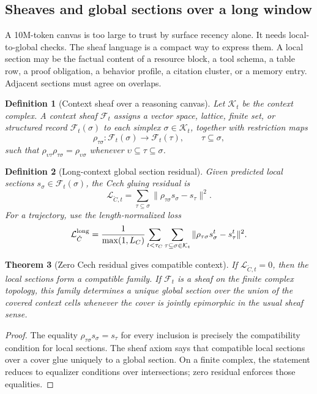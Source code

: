 \documentclass[11pt]{article}
\newtheorem{theorem}{Theorem}[section]
\newtheorem{definition}[theorem]{Definition}
\newcommand{\calK}{\mathcal{K}}
\newcommand{\calF}{\mathcal{F}}
\newcommand{\loss}{\mathcal{L}}
\numberwithin{equation}{section}
\begin{document}
\subsection{Sheaves and global sections over a long window}
A 10M-token canvas is too large to trust by surface recency alone. It needs local-to-global checks. The sheaf language is a compact way to express them. A local section may be the factual content of a resource block, a tool schema, a table row, a proof obligation, a behavior profile, a citation cluster, or a memory entry. Adjacent sections must agree on overlaps.

\begin{definition}[Context sheaf over a reasoning canvas]
Let $\calK_t$ be the context complex. A context sheaf $\calF_t$ assigns a vector space, lattice, finite set, or structured record $\calF_t(\sigma)$ to each simplex $\sigma\in\calK_t$, together with restriction maps
\begin{equation}
\rho_{\tau\sigma}:\calF_t(\sigma)\to\calF_t(\tau),\qquad \tau\subseteq\sigma,
\end{equation}
such that $\rho_{\upsilon\tau}\rho_{\tau\sigma}=\rho_{\upsilon\sigma}$ whenever $\upsilon\subseteq\tau\subseteq\sigma$.
\end{definition}

\begin{definition}[Long-context global section residual]
Given predicted local sections $s_\sigma\in\calF_t(\sigma)$, the Cech gluing residual is
\begin{equation}
\loss_{\check C,t}=\sum_{\tau\subseteq\sigma}\|\rho_{\tau\sigma}s_\sigma-s_\tau\|^2.
\end{equation}
For a trajectory, use the length-normalized loss
\begin{equation}
\loss_{\check C}^{\rm long}=\frac1{\max(1,L_C)}\sum_{t<\tau_C}\sum_{\tau\subseteq\sigma\in\calK_t}\|\rho_{\tau\sigma}s^t_\sigma-s^t_\tau\|^2.
\end{equation}
\end{definition}

\begin{theorem}[Zero Cech residual gives compatible context]
If $\loss_{\check C,t}=0$, then the local sections form a compatible family. If $\calF_t$ is a sheaf on the finite complex topology, this family determines a unique global section over the union of the covered context cells whenever the cover is jointly epimorphic in the usual sheaf sense.
\end{theorem}
\begin{proof}
The equality $\rho_{\tau\sigma}s_\sigma=s_\tau$ for every inclusion is precisely the compatibility condition for local sections. The sheaf axiom says that compatible local sections over a cover glue uniquely to a global section. On a finite complex, the statement reduces to equalizer conditions over intersections; zero residual enforces those equalities.
\end{proof}
\end{document}
